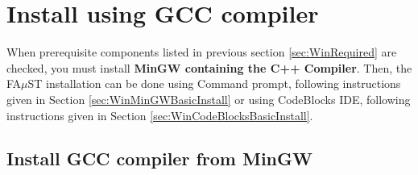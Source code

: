 \section{Install using GCC compiler}\label{sec:WinInstallMinGW}

When prerequisite components listed in previous section \ref{sec:WinRequired} are checked, you must install \textbf{MinGW containing the C++ Compiler}. 
Then, the FA$\mu$ST installation can be done using Command prompt, following instructions given in Section \ref{sec:WinMinGWBasicInstall} or using CodeBlocks IDE, following instructions given in Section \ref{sec:WinCodeBlocksBasicInstall}. 


\subsection{Install GCC compiler from MinGW}
\label{sec:WinInstallCompilerMinGW}

